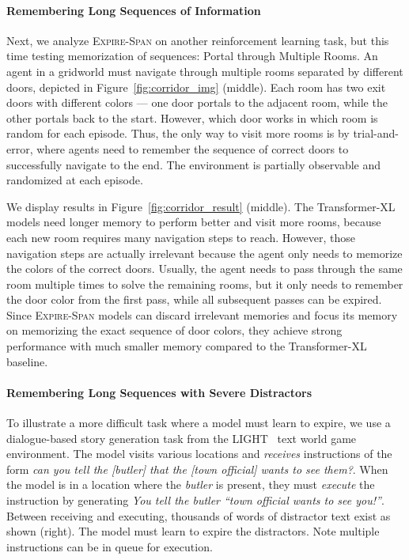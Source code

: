 \paragraph{Remembering Long Sequences of Information} 

Next, we analyze \textsc{Expire-Span} on another reinforcement learning task, but this time testing memorization of sequences: Portal through Multiple Rooms. An agent in a gridworld must navigate through multiple rooms separated by different doors, depicted in Figure~\ref{fig:corridor_img} (middle). Each room has two exit doors with different colors --- one door portals to the adjacent room, while the other portals back to the start. 
However, which door works in which room is random for each episode. 
Thus, the only way to visit more rooms is by trial-and-error, where agents need to remember the sequence of correct doors to successfully navigate to the end. 
The environment is  partially observable and randomized at each episode.

We display results in Figure~\ref{fig:corridor_result} (middle). The Transformer-XL models need longer memory to perform better and visit more rooms, because each new room requires many navigation steps to reach.
However, those navigation steps are actually irrelevant because the agent only needs to memorize the colors of the correct doors.
Usually, the agent needs to pass through the same room multiple times to solve the remaining rooms, but it only needs to remember the door color from the first pass, while all subsequent passes can be expired.
Since \textsc{Expire-Span} models can discard irrelevant memories and focus its memory on memorizing the exact sequence of door colors, they achieve strong performance with much smaller memory compared to the Transformer-XL baseline. 



\paragraph{Remembering Long Sequences with Severe Distractors}

To illustrate a more difficult task where a model must learn to expire,
we use a dialogue-based story generation task from the LIGHT~\citep{urbanek2019learning} text world game environment. The model visits various locations and \textit{receives} instructions of the form \textit{can you tell the [butler] that the [town official] wants to see them?}. When the model is in a location where the \textit{butler} is present, they must \textit{execute} the instruction by generating \textit{You tell the butler ``town official wants to see you!''}.  Between receiving and executing, thousands of words of distractor text exist as shown  (right). The model must learn to expire the distractors. Note multiple instructions can be in queue for execution.

